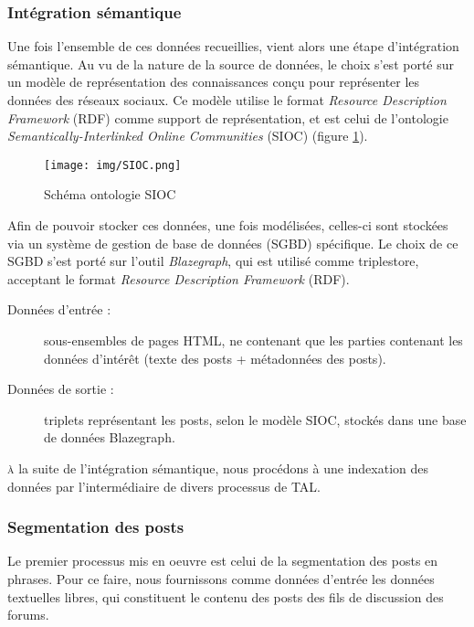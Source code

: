 \documentclass[a4paper, 12pt, openany, oneside, abstract=on]{article} %
\begin{document}
\subsubsection{Intégration sémantique}
Une fois l'ensemble de ces données recueillies, vient alors une étape d'intégration sémantique. Au vu de la nature de la source de données, le choix s'est porté sur un modèle de représentation des connaissances conçu pour représenter les données des réseaux sociaux. Ce modèle utilise le format \emph{Resource Description Framework} (RDF) comme support de représentation, et est celui de l'ontologie \emph{Semantically-Interlinked Online Communities}\cite{Breslin2010} (SIOC) (figure \ref{fig:SIOC}).
\begin{figure}[H]
    \centering
    \texttt{[image: img/SIOC.png]}
    \caption{\label{fig:SIOC}Schéma ontologie SIOC}
\end{figure}
Afin de pouvoir stocker ces données, une fois modélisées, celles-ci sont stockées via un système de gestion de base de données (SGBD) spécifique. Le choix de ce SGBD s'est porté sur l'outil \emph{Blazegraph}\cite{Systap}, qui est utilisé comme triplestore, acceptant le format \emph{Resource Description Framework} (RDF).
\begin{description}
    \item[Données d'entrée :] sous-ensembles de pages HTML, ne contenant que les parties contenant les données d'intérêt (texte des posts + métadonnées des posts).
    \item[Données de sortie :] triplets représentant les posts, selon le modèle SIOC, stockés dans une base de données Blazegraph.
\end{description}

\textsc{à} la suite de l'intégration sémantique, nous procédons à une indexation des données par l'intermédiaire de divers processus de TAL.

\subsubsection{Segmentation des posts}
Le premier processus mis en oeuvre est celui de la segmentation des posts en phrases.
Pour ce faire, nous fournissons comme données d'entrée les données textuelles libres, qui constituent le contenu des posts des fils de discussion des forums.
\end{document}
